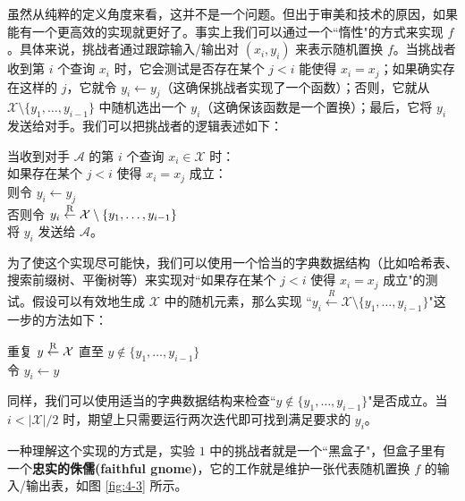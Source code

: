 虽然从纯粹的定义角度来看，这并不是一个问题。但出于审美和技术的原因，如果能有一个更高效的实现就更好了。事实上我们可以通过一个``惰性"的方式来实现 $f$。具体来说，挑战者通过跟踪输入/输出对 $(x_i,y_i)$ 来表示随机置换 $f$。当挑战者收到第 $i$ 个查询 $x_i$ 时，它会测试是否存在某个 $j<i$ 能使得 $x_i=x_j$；如果确实存在这样的 $j$，它就令 $y_i\leftarrow y_j$（这确保挑战者实现了一个函数）；否则，它就从 $\mathcal{X}\setminus\{y_1,\dots,y_{i-1}\}$ 中随机选出一个 $y_i$（这确保该函数是一个置换）；最后，它将 $y_i$ 发送给对手。我们可以把挑战者的逻辑表述如下：

\vspace*{5pt}

\hspace*{5pt} 当收到对手 $\mathcal{A}$ 的第 $i$ 个查询 $x_i\in\mathcal{X}$ 时：\\
\hspace*{50pt} 如果存在某个 $j<i$ 使得 $x_i=x_j$ 成立：\\
\hspace*{75pt} 则令 $y_i\leftarrow y_j$\\
\hspace*{75pt} 否则令 $y_i\overset{\rm R}\leftarrow\mathcal{X}\setminus\{y_1,\dots,y_{i-1}\}$\\
\hspace*{50pt} 将 $y_i$ 发送给 $\mathcal{A}$。

\vspace*{5pt}

\noindent
为了使这个实现尽可能快，我们可以使用一个恰当的字典数据结构（比如哈希表、搜索前缀树、平衡树等）来实现对``如果存在某个 $j<i$ 使得 $x_i=x_j$ 成立"的测试。假设可以有效地生成 $\mathcal{X}$ 中的随机元素，那么实现 ``$y_i\overset{R}\leftarrow\mathcal{X}\setminus\{y_1,\dots,y_{i-1}\}$"这一步的方法如下：

\vspace*{5pt}

\hspace*{5pt} 重复 $y\overset{\rm R}\leftarrow\mathcal{X}$ 直至 $y\notin\{y_1,\dots,y_{i-1}\}$\\
\hspace*{26pt} 令 $y_i\leftarrow y$

\vspace*{5pt}

\noindent
同样，我们可以使用适当的字典数据结构来检查``$y\notin\{y_1,\dots,y_{i-1}\}$"是否成立。当 $i<{|\mathcal{X}|}/{2}$ 时，期望上只需要运行两次迭代即可找到满足要求的 $y_i$。

一种理解这个实现的方式是，实验 $1$ 中的挑战者就是一个``黑盒子"，但盒子里有一个\textbf{忠实的侏儒(faithful gnome)}，它的工作就是维护一张代表随机置换 $f$ 的输入/输出表，如图 \ref{fig:4-3} 所示。

